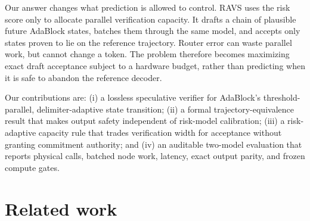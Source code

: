 \documentclass{article}
\newcommand{\method}{\textsc{RAVS}\xspace}
\begin{document}
Our answer changes what prediction is allowed to control. \method uses the risk score only to
allocate parallel verification capacity. It drafts a chain of plausible future AdaBlock states,
batches them through the same model, and accepts only states proven to lie on the reference
trajectory. Router error can waste parallel work, but cannot change a token. The problem therefore
becomes maximizing exact draft acceptance subject to a hardware budget, rather than predicting
when it is safe to abandon the reference decoder.

Our contributions are: (i) a lossless speculative verifier for AdaBlock's threshold-parallel,
delimiter-adaptive state transition; (ii) a formal trajectory-equivalence result that makes output
safety independent of risk-model calibration; (iii) a risk-adaptive capacity rule that trades
verification width for acceptance without granting commitment authority; and (iv) an auditable
two-model evaluation that reports physical calls, batched node work, latency, exact output parity,
and frozen compute gates.

\section{Related work}
\end{document}
